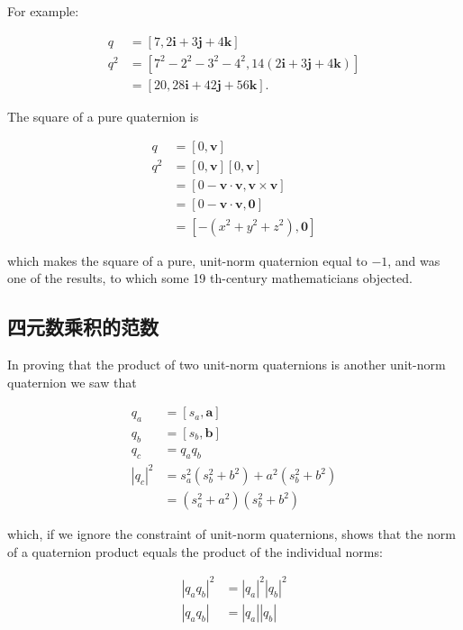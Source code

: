 For example:

$$
\begin{aligned}
q & =[7,2 \mathbf{i}+3 \mathbf{j}+4 \mathbf{k}] \\
q^{2} & =\left[7^{2}-2^{2}-3^{2}-4^{2}, 14(2 \mathbf{i}+3 \mathbf{j}+4 \mathbf{k})\right] \\
& =[20,28 \mathbf{i}+42 \mathbf{j}+56 \mathbf{k}] .
\end{aligned}
$$

The square of a pure quaternion is

$$
\begin{aligned}
q & =[0, \mathbf{v}] \\
q^{2} & =[0, \mathbf{v}][0, \mathbf{v}] \\
& =[0-\mathbf{v} \cdot \mathbf{v}, \mathbf{v} \times \mathbf{v}] \\
& =[0-\mathbf{v} \cdot \mathbf{v}, \mathbf{0}] \\
& =\left[-\left(x^{2}+y^{2}+z^{2}\right), \mathbf{0}\right]
\end{aligned}
$$

which makes the square of a pure, unit-norm quaternion equal to $-1$, and was one of the results, to which some 19 th-century mathematicians objected.

\subsection{四元数乘积的范数}
In proving that the product of two unit-norm quaternions is another unit-norm quaternion we saw that

$$
\begin{aligned}
q_{a} & =\left[s_{a}, \mathbf{a}\right] \\
q_{b} & =\left[s_{b}, \mathbf{b}\right] \\
q_{c} & =q_{a} q_{b} \\
\left|q_{c}\right|^{2} & =s_{a}^{2}\left(s_{b}^{2}+b^{2}\right)+a^{2}\left(s_{b}^{2}+b^{2}\right) \\
& =\left(s_{a}^{2}+a^{2}\right)\left(s_{b}^{2}+b^{2}\right)
\end{aligned}
$$

which, if we ignore the constraint of unit-norm quaternions, shows that the norm of a quaternion product equals the product of the individual norms:

$$
\begin{aligned}
\left|q_{a} q_{b}\right|^{2} & =\left|q_{a}\right|^{2}\left|q_{b}\right|^{2} \\
\left|q_{a} q_{b}\right| & =\left|q_{a}\right|\left|q_{b}\right|
\end{aligned}
$$

